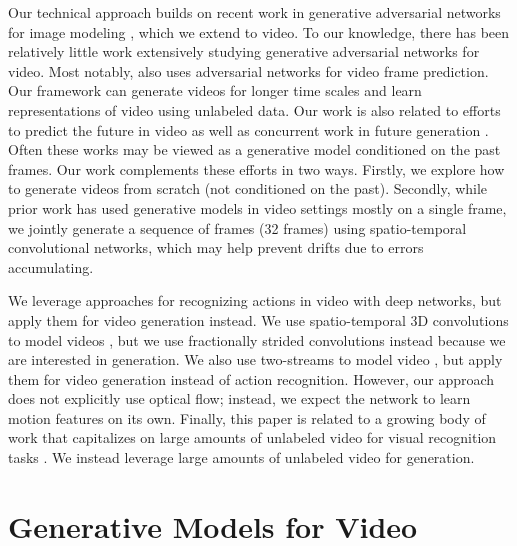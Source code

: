 \documentclass{article}
\begin{document}
Our technical approach builds on recent work in generative adversarial networks
for image modeling
\cite{goodfellow2014generative,radford2015unsupervised,denton2015deep,wang2016generative,pathak2016context},
which we extend to video. To our knowledge, there has been relatively little
work extensively studying generative adversarial networks for video. Most
notably, \cite{mathieu2015deep} also uses adversarial networks for video frame
prediction. Our framework can generate videos for longer time scales and learn
representations of video using unlabeled data.  Our work is also related to
efforts to predict the future in video
\cite{ranzato2014video,mathieu2015deep,walker2014patch,yuen2010data,vondrick2015anticipating,kitani2012activity,fragkiadaki2015recurrent,zhou2015temporal} as well as concurrent
work in future generation \cite{finn2016unsupervised,kalchbrenner2016video,lotter2016deep,xue2016visual,zhou2016learning,walker2016uncertain}.
Often these works may be viewed as a generative model conditioned on the past
frames. Our work complements these efforts in two ways. Firstly, we explore how
to generate videos from scratch (not conditioned on the past). Secondly, while
prior work has used generative models in video settings mostly on a single
frame, we jointly generate a sequence of frames (32 frames) using
spatio-temporal convolutional networks, which may help prevent drifts due to
errors accumulating.

We leverage approaches for recognizing actions in video with deep networks, but apply them for video generation instead. We use spatio-temporal 3D convolutions to model videos \cite{tran2014learning}, but we use fractionally strided convolutions \cite{zeiler2010deconvolutional} instead because we are interested in generation. We also use two-streams to model video \cite{simonyan2014two}, but apply them for video generation instead of action recognition. However, our approach does not explicitly use optical flow; instead, we expect the network to learn motion features on its own.  Finally, this paper is related to a growing body of work that capitalizes on large amounts of unlabeled video for visual recognition tasks \cite{le2013building,wang2015unsupervised,srivastava2015unsupervised,jayaraman2015learning,misra2016unsupervised,mobahi2009deep,chen2013watching,ramanathan2015learning,nguyen2016open,owens2016ambient,li2015unsupervised,vondrick2013efficiently,vondrick2015anticipating,soundnet}. We instead leverage large amounts of unlabeled video for generation.

\section{Generative Models for Video} 
\end{document}
